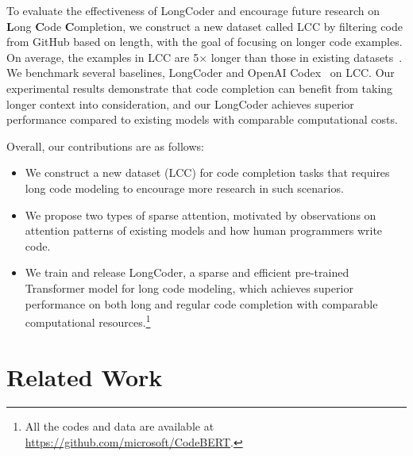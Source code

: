 \documentclass{article}
\begin{document}
To evaluate the effectiveness of LongCoder and encourage future research on \textbf{L}ong \textbf{C}ode \textbf{C}ompletion, we construct a new dataset called LCC by filtering code from GitHub based on length, with the goal of focusing on longer code examples. On average, the examples in LCC are 5$\times$ longer than those in existing datasets~\citep{lu2021codexglue}. We benchmark several baselines, LongCoder and OpenAI Codex~\citep{chen2021evaluating} on LCC. Our experimental results demonstrate that code completion can benefit from taking longer context into consideration, and our LongCoder achieves superior performance compared to existing models with comparable %
computational costs. 



Overall, our contributions are as follows:
\begin{itemize}
    \item We construct a new dataset (LCC) for code completion tasks that requires long code modeling to encourage more research in such scenarios.
    \item We propose two types of sparse attention, motivated by observations on attention patterns of existing models and how human programmers write code.
    \item We train and release LongCoder, a sparse and efficient pre-trained Transformer model for long code modeling, which achieves superior performance on both long and regular code completion with comparable computational resources.\footnote{All the codes and data are available at \url{https://github.com/microsoft/CodeBERT}.}  
\end{itemize}


\section{Related Work}
\end{document}
